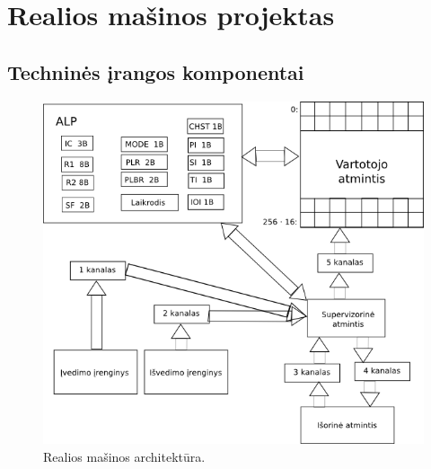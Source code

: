 \section{Realios mašinos projektas}

\subsection{Techninės įrangos komponentai}

\begin{figure}[H]
  \begin{center}
    \includegraphics[width=1.0\linewidth]{rm.png}
  \end{center}
  \caption{Realios mašinos architektūra.}
  \label{fig:rm}
\end{figure}

